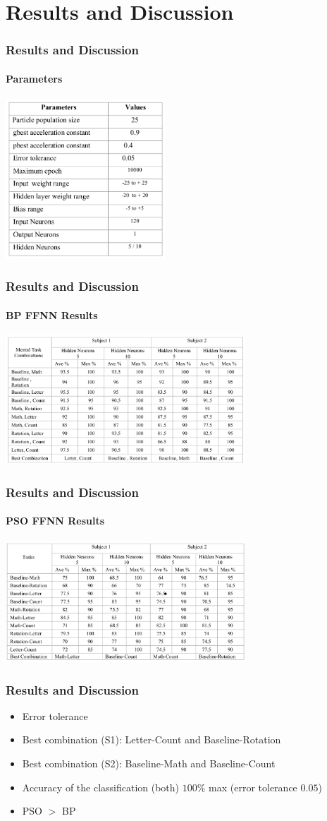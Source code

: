 \section{Results and Discussion}

\frame
{
\frametitle{Results and Discussion}
\framesubtitle{Parameters}
\begin{center}
	\includegraphics[width=6cm]{img/table1}
\end{center}
}

\frame
{
\frametitle{Results and Discussion}
\framesubtitle{BP FFNN Results}
\begin{center}
	\includegraphics[width=9cm]{img/table2}
\end{center}
}

\frame
{
\frametitle{Results and Discussion}
\framesubtitle{PSO FFNN Results}
\begin{center}
	\includegraphics[width=9cm]{img/table3}
\end{center}
}

\frame
{
\frametitle{Results and Discussion}
\begin{itemize}
	\item Error tolerance
	\item Best combination (S1): Letter-Count and Baseline-Rotation
	\item Best combination (S2): Baseline-Math and Baseline-Count
	\item Accuracy of the classification (both) $100\%$ max (error tolerance $0.05$)
	\item PSO $>$ BP
\end{itemize}

}
